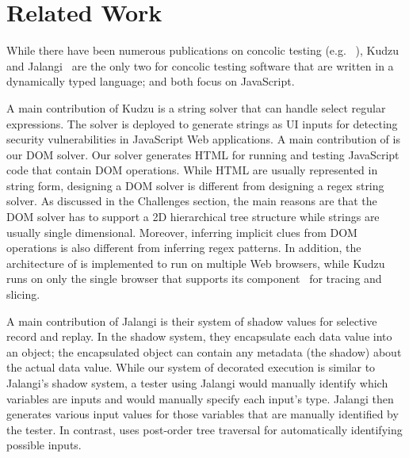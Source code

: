 \section{Related Work}


While there have been numerous publications on concolic testing (e.g. ~\cite{cute, klee, eventConcolic}), 
Kudzu~\cite{kudzu} and Jalangi~\cite{jalangi} are the only two for concolic testing software that are written in a dynamically typed language; and both focus on JavaScript.  

A main contribution of Kudzu is a string solver that can handle select regular expressions.  
The solver is deployed to generate strings as UI inputs for detecting security vulnerabilities in JavaScript Web applications.   
A main contribution of \tool is our DOM solver.  Our solver generates HTML for running and testing JavaScript code that contain DOM operations.    
While HTML are usually represented in string form, designing a DOM solver is different from designing a regex string solver.
As discussed in the Challenges section, the main reasons are that the DOM solver has to support a 2D hierarchical tree structure while strings are usually single dimensional.  
Moreover, inferring implicit clues from DOM operations is also different from inferring regex patterns.  
In addition, the architecture of \tool is implemented to run on multiple Web browsers, while Kudzu runs on only the single browser that supports its component~\cite{flax} for tracing and slicing.    

A main contribution of Jalangi is their system of shadow values for selective record and replay.  
In the shadow system, they encapsulate each data value into an object; the encapsulated object can contain any metadata (the shadow) about the actual data value.  
While our system of decorated execution is similar to Jalangi's shadow system, a tester using Jalangi would manually identify which variables are inputs and would manually specify each input's type.  
Jalangi then generates various input values for those variables that are manually identified by the tester.  
In contrast, \tool uses post-order tree traversal for automatically identifying possible inputs.  

